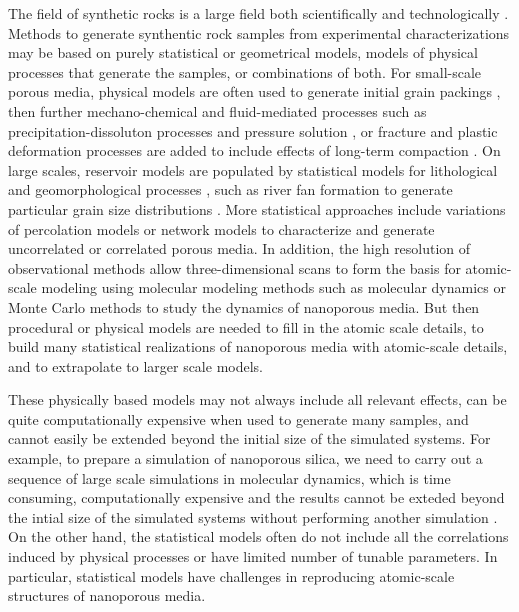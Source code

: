 \documentclass[aps,pre,twocolumn,letterpaper,floatfix,showpacs]{revtex4}
\begin{document}
The field of synthetic rocks is a large field both scientifically and technologically \citep{biswal2007stochastic,hamzehpour2006development, yeong1998reconstructing}. 
Methods to generate synthentic rock samples from experimental characterizations may be based on 
purely statistical or geometrical models, models of physical processes that generate the samples, or combinations of both. 
For small-scale porous media, physical models are often used to generate initial grain
packings \cite{pilotti1998generation,scott1969density,herrmann2013physics}, then further mechano-chemical
and fluid-mediated processes such as precipitation-dissoluton processes and pressure
solution \cite{rutter1983pressure}, or fracture and plastic deformation processes are added
to include effects of long-term compaction \cite{rutter1983pressure,renard1997pressure}. 
On large scales, reservoir models are populated by statistical models for lithological and
geomorphological processes \cite{pyrcz2014geostatistical}, such as river fan formation to
generate particular grain size distributions \cite{koltermann1996heterogeneity,blair1994alluvial}. 
More statistical approaches include variations of percolation models \cite{sahimi} or
network models \cite{fatt1956network,sahimi1993flow} to characterize and generate uncorrelated or correlated porous media. 
In addition, the high resolution of observational methods allow three-dimensional scans to
form the basis for atomic-scale modeling using molecular modeling methods such as
molecular dynamics or Monte Carlo methods to study the dynamics of nanoporous media. 
But then procedural or physical models are needed to fill in the atomic scale details, to
build many statistical realizations of nanoporous media with atomic-scale details, and to extrapolate to larger scale models.

These physically based models may not always include all relevant effects, can be quite
computationally expensive when used to generate many samples, and cannot easily be extended
beyond the initial size of the simulated systems. 
For example, to prepare a simulation of nanoporous silica, we need to carry out a sequence
of large scale simulations in molecular dynamics, which is time consuming, computationally
expensive and the results cannot be exteded beyond the intial size of the simulated systems
without performing another simulation \cite{Adarsh}. 
On the other hand, the statistical models often do not include all the correlations induced
by physical processes or have limited number of tunable parameters. 
In particular, statistical models have challenges in reproducing atomic-scale structures of nanoporous media. 
\end{document}
